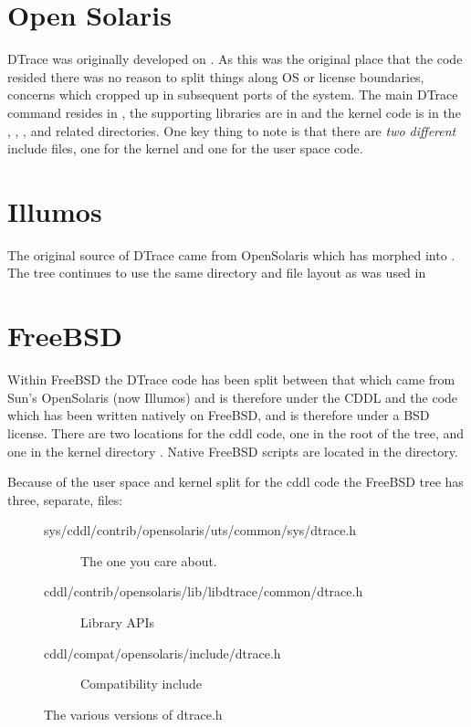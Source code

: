 \section{Open Solaris}
\label{sec:open-solaris-code}

DTrace was originally developed on .  As this
was the original place that the code resided there was no reason to
split things along OS or license boundaries, concerns which cropped up
in subsequent ports of the system.  The main DTrace command resides in
, the supporting libraries are in
 and the kernel code is in the
, , , and
related directories.  One key thing to note is that there are
\emph{two different}  include files, one for the
kernel and one for the user space code.

\section{Illumos}
\label{sec:illumos-code}

The original source of DTrace came from OpenSolaris which has morphed
into .  The  tree continues to use
the same directory and file layout as was used in

\section{FreeBSD}
\label{sec:freebsd-code}

Within FreeBSD the DTrace code has been split between that which came
from Sun's OpenSolaris (now Illumos) and is therefore under the CDDL
and the code which has been written natively on FreeBSD, and is
therefore under a BSD license.  There are two locations for the cddl
code, one in the root of the tree,  and one in the
kernel directory .  Native FreeBSD scripts are
located in the  directory.

Because of the user space and kernel split for the cddl code the
FreeBSD tree has three, separate,  files:

\begin{figure}
  \centering
\begin{description}
\item [sys/cddl/contrib/opensolaris/uts/common/sys/dtrace.h] The one
  you care about.
\item [cddl/contrib/opensolaris/lib/libdtrace/common/dtrace.h] Library APIs
\item [cddl/compat/opensolaris/include/dtrace.h] Compatibility include
\end{description}
  \caption{The various versions of dtrace.h}
  \label{fig:freebsd-dtrace-h}
\end{figure}

